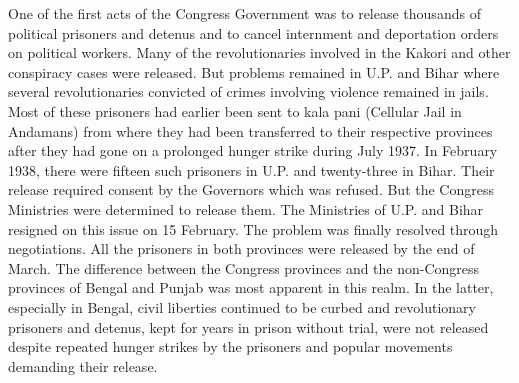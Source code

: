 \begin{multicols}{2}
One of the first acts of the Congress Government was to release thousands of political prisoners and detenus and to cancel internment and deportation orders on political workers. Many of the revolutionaries involved in the Kakori and other conspiracy cases were released. But problems remained in U.P. and Bihar where several revolutionaries convicted of crimes involving violence remained in jails. Most of these prisoners had earlier been sent to kala pani (Cellular Jail in Andamans) from where they had been transferred to their respective provinces after they had gone on a prolonged hunger strike during July 1937. In February 1938, there were fifteen such prisoners in U.P. and twenty-three in Bihar. Their release required consent by the Governors which was refused. But the Congress Ministries were determined to release them. The Ministries of U.P. and Bihar resigned on this issue on 15 February. The problem was finally resolved through negotiations. All the prisoners in both provinces were released by the end of March. The difference between the Congress provinces and the non-Congress provinces of Bengal and Punjab was most apparent in this realm. In the latter, especially in Bengal, civil liberties continued to be curbed and revolutionary prisoners and detenus, kept for years in prison without trial, were not released despite repeated hunger strikes by the prisoners and popular movements demanding their release.


\end{multicols}
